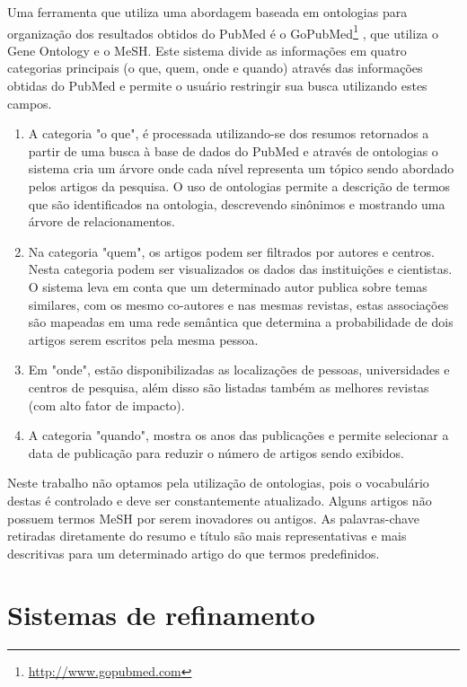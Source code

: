 Uma ferramenta que utiliza uma abordagem baseada em ontologias para organização dos resultados obtidos do PubMed é o GoPubMed\footnote{\href{http://www.gopubmed.com}{http://www.gopubmed.com}} \cite{Doms2005}, que utiliza o Gene Ontology e o MeSH. Este sistema divide as informações em quatro categorias principais (o que, quem, onde e quando) através das informações obtidas do PubMed e  permite o usuário restringir sua busca utilizando estes campos.

\begin{enumerate}
\item A categoria "o que", é processada utilizando-se dos resumos retornados a partir de uma busca à base de dados do PubMed e através de ontologias o sistema cria um árvore onde cada nível representa um tópico sendo abordado pelos artigos da pesquisa. O uso de ontologias permite a descrição de termos que são identificados na ontologia, descrevendo sinônimos e mostrando uma árvore de relacionamentos.

\item Na categoria "quem", os artigos podem ser filtrados por autores e centros. Nesta categoria podem ser visualizados os dados das instituições e cientistas. O sistema leva em conta que um determinado autor publica sobre temas similares, com os mesmo co-autores e nas mesmas revistas, estas associações são mapeadas em uma rede semântica que determina a probabilidade de dois artigos serem escritos pela mesma pessoa.

\item Em "onde", estão disponibilizadas as localizações de pessoas, universidades e centros de pesquisa, além disso são listadas também as melhores revistas (com alto fator de impacto).

\item A categoria "quando", mostra os anos das publicações e permite selecionar a data de publicação para reduzir o número de artigos sendo exibidos.
\end{enumerate}

Neste trabalho não optamos pela utilização de ontologias, pois o vocabulário destas é controlado e deve ser constantemente atualizado. Alguns artigos não possuem termos MeSH por serem inovadores ou antigos. As palavras-chave retiradas diretamente do resumo e título são mais representativas e mais descritivas para um determinado artigo do que termos predefinidos.

\section{Sistemas de refinamento}

